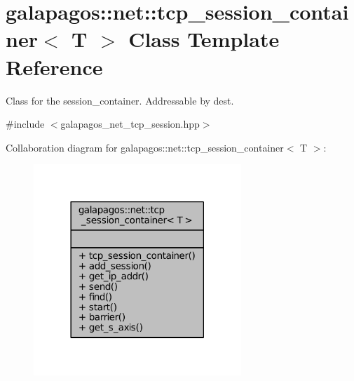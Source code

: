 \hypertarget{classgalapagos_1_1net_1_1tcp__session__container}{}\section{galapagos\+:\+:net\+:\+:tcp\+\_\+session\+\_\+container$<$ T $>$ Class Template Reference}
\label{classgalapagos_1_1net_1_1tcp__session__container}


Class for the session\+\_\+container. Addressable by dest.  




{\ttfamily \#include $<$galapagos\+\_\+net\+\_\+tcp\+\_\+session.\+hpp$>$}



Collaboration diagram for galapagos\+:\+:net\+:\+:tcp\+\_\+session\+\_\+container$<$ T $>$\+:
\nopagebreak
\begin{figure}[H]
\begin{center}
\leavevmode
\includegraphics[width=222pt]{classgalapagos_1_1net_1_1tcp__session__container__coll__graph}
\end{center}
\end{figure}
